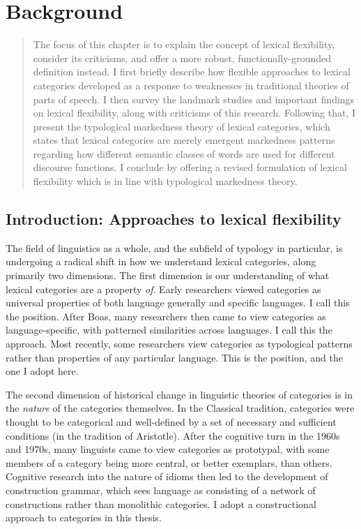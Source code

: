 \chapter{Background}
\label{ch:background}

\blockquote{The focus of this chapter is to explain the concept of lexical flexibility, consider its criticisms, and offer a more robust, functionally-grounded definition instead. I first briefly describe how flexible approaches to lexical categories developed as a response to weaknesses in traditional theories of parts of speech. I then survey the landmark studies and important findings on lexical flexibility, along with criticisms of this research. Following that, I present the typological markedness theory of lexical categories, which states that lexical categories are merely emergent markedness patterns regarding how different semantic classes of words are used for different discourse functions. I conclude by offering a revised formulation of lexical flexibility which is in line with typological markedness theory.}

\section{Introduction: Approaches to lexical flexibility}
\label{sec:2.1}

The field of linguistics as a whole, and the subfield of typology in particular, is undergoing a radical shift in how we understand lexical categories, along primarily two dimensions. The first dimension is our understanding of what lexical categories are a property \emph{of}. Early researchers viewed categories as universal properties of both language generally and specific languages. I call this the  position. After Boas, many researchers then came to view categories as language-specific, with patterned similarities across languages. I call this the  approach. Most recently, some researchers view categories as typological patterns rather than properties of any particular language. This is the  position, and the one I adopt here.

The second dimension of historical change in linguistic theories of categories is in the \emph{nature} of the categories themselves. In the Classical tradition, categories were thought to be categorical and well-defined by a set of necessary and sufficient conditions (in the tradition of Aristotle). After the cognitive turn in the 1960s and 1970s, many linguists came to view categories as prototypal, with some members of a category being more central, or better exemplars, than others. Cognitive research into the nature of idioms then led to the development of construction grammar, which sees language as consisting of a network of constructions rather than monolithic categories. I adopt a constructional approach to categories in this thesis.

